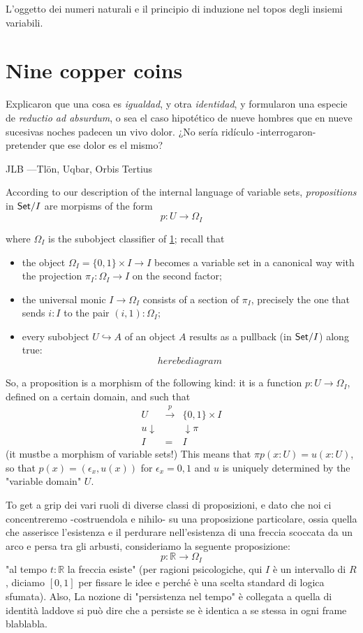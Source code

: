\documentclass{amsart}
\begin{document}
L'oggetto dei numeri naturali e il principio di induzione nel topos degli insiemi variabili.
\section{Nine copper coins}
\epigraph{Explicaron que una cosa es \emph{igualdad}, y otra \emph{identidad}, y formularon una especie de \emph{reductio ad absurdum}, o sea el caso hipotético de nueve hombres que en nueve sucesivas noches padecen un vivo dolor. ¿No sería ridículo -interrogaron- pretender que ese dolor es el mismo?}{JLB ---Tl\"on, Uqbar, Orbis Tertius}
According to our description of the internal language of variable sets, \emph{propositions} in $\mathsf{Set}/I$ are morpisms of the form
\[p : U \to \Omega_I\]

where $\Omega_I$ is the subobject classifier of \ref{}; recall that
\begin{itemize}
  \item the object $\Omega_I = \{0,1\}\times I \to I$ becomes a variable set in a canonical way with the projection $\pi_I : \Omega_I \to I$ on the second factor;
  \item the universal monic $I \to \Omega_I$ consists of a section of $\pi_I$, precisely the one that sends $i : I$ to the pair $(i,1) : \Omega_I$;
  \item every subobject $U \hookrightarrow A$ of an object $A$ results as a pullback (in $\mathsf{Set}/I$) along true:
        \[here be diagram\]
\end{itemize}
So, a proposition is a morphism of the following kind: it is a function $p : U \to \Omega_I$, defined on a certain domain, and such that
$$
  \begin{array}{ccc}
    U           & \overset{p}\to & \{0,1\}\times I \\
    u\downarrow &                & \downarrow\pi   \\
    I           & =              & I
  \end{array}
$$
(it mustbe a morphism of variable sets!) This means that $\pi p(x : U) = u(x : U)$, so that $p(x) = (\epsilon_x, u(x))$ for $\epsilon_x =0,1$ and $u$ is uniquely determined by the "variable domain" $U$.

To get a grip dei vari ruoli di diverse classi di proposizioni, e dato che noi ci concentreremo -costruendola e nihilo- su una proposizione particolare, ossia quella che asserisce l'esistenza e il perdurare nell'esistenza di una freccia scoccata da un arco e persa tra gli arbusti, consideriamo la seguente proposizione:
\[p : \mathbb R \to \Omega_I\]
"al tempo $t : \mathbb R$ la freccia esiste" (per ragioni psicologiche, qui $I$ è un intervallo di $R$, diciamo $[0,1]$ per fissare le idee e perché è una scelta standard di logica sfumata). Also, La nozione di "persistenza nel tempo" è collegata a quella di identità laddove si può dire che a persiste se è identica a se stessa in ogni frame blablabla.
\end{document}
